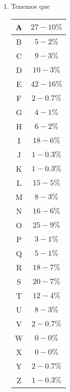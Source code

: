 \documentclass[letterpaper,11pt]{article}
\begin{document}
\begin{enumerate}
\begin{enumerate}
\begin{enumerate}
            \item Tenemos que 
            \begin{center}
                \begin{tabular}{|c|c|}
                \hline
                A & $27-10\%$ \\ \hline
                B & $5-2\%$ \\ \hline
                C & $9-3\%$ \\ \hline
                D & $10-3\%$ \\ \hline
                E & $42-16\%$ \\ \hline
                F & $2-0.7\%$ \\ \hline
                G & $4-1\%$ \\ \hline
                H & $6-2\%$ \\ \hline
                I & $18-6\%$ \\ \hline
                J & $1-0.3\%$ \\ \hline
                K & $1-0.3\%$ \\ \hline
                L & $15-5\%$ \\ \hline
                M & $8-3\%$ \\ \hline
                N & $16-6\%$ \\ \hline
                O & $25-9\%$ \\ \hline
                P & $3-1\%$\\ \hline
                Q & $5-1\%$ \\ \hline
                R & $18-7\%$ \\ \hline
                S & $20-7\%$ \\ \hline
                T & $12-4\%$ \\ \hline
                U & $8-3\%$ \\ \hline
                V & $2-0.7\%$ \\ \hline
                W & $0-0\%$ \\ \hline
                X & $0-0\%$ \\ \hline
                Y & $2-0.7\%$ \\ \hline
                Z & $1-0.3\%$ \\ \hline
                \end{tabular}
            \end{center}
            

\end{enumerate}
\end{enumerate}
\end{enumerate}
\end{document}
